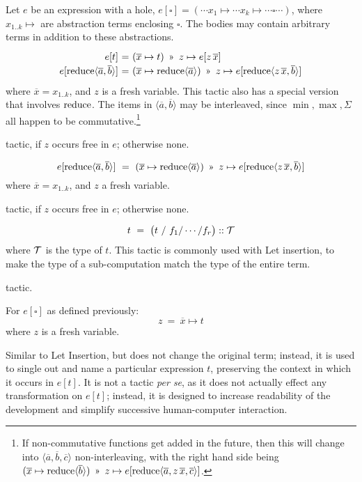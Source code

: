 \vspace{3mm}
Let $e$ be an expression with a hole, $e[\square] = (\cdots x_1 \mapsto \cdots x_k\mapsto \cdots \square \cdots)$, 
where $x_{1..k}\mapsto$ are abstraction terms enclosing $\square$. The bodies may contain arbitrary terms
in addition to these abstractions.
%
\[\renewcommand\arraystretch{1.2}
  \begin{array}{@{}r@{}c@{}l@{}}
  e[t] & ~=~ & (\overline{x}\mapsto t) ~\applt~ z\mapsto e[z\,\overline{x}] \\
  e[\reduce \langle\overline{a},\overline{b}\rangle] & ~=~ &
     (\overline{x}\mapsto \reduce\langle\overline{a}\rangle) ~\applt~ z\mapsto e[\reduce\langle z\,\overline{x}, \overline{b}\rangle]
  \end{array}\]
%
where $\overline{x}=x_{1..k}$, and $z$ is a fresh variable.
This tactic also has a special version that involves $\operatorname{reduce}$.
The items in $\langle \overline{a},\overline{b}\rangle$ may be interleaved, since
$\min,\max,\Sigma$ all happen to be commutative.\footnote{If non-commutative functions get added in the future, then this will change into $\langle \overline{a}, \overline{b}, \overline{c}\rangle$ non-interleaving, with the right hand side being $(\overline{x}\mapsto \reduce\langle\overline{b}\rangle) ~\applt~ z\mapsto e[\reduce\langle \overline{a}, z\,\overline{x}, \overline{c}\rangle]$.}

\Obligations tactic, if $z$ occurs free in $e$; otherwise none.

%
\[e[\reduce \langle\overline{a},\overline{b}\rangle] ~=~ 
  (\overline{x}\mapsto \reduce\langle\overline{a}\rangle) ~\applt~ z\mapsto e[\reduce\langle z\,\overline{x}, \overline{b}\rangle]\]
%
where $\overline{x}=x_{1..k}$, and $z$ a fresh variable.

\Obligations tactic, if $z$ occurs free in $e$; otherwise none.

\[t ~=~ \big(t~/~f_1/\cdots/f_r\big) :: \mathcal{T}\]
%
where $\mathcal{T}$ is the type of $t$. This tactic is commonly used with Let insertion,
to make the type of a sub-computation match the type of the entire term.

\Obligations tactic.

\vspace{3mm}
For $e[\square]$ as defined previously:
\[z ~=~ \overline{x}\mapsto t\]
%
where $z$ is a fresh variable.

Similar to Let Insertion, but does not change the original term; instead,
it is used to single out and name a particular expression $t$, preserving the context
in which it occurs in $e[t]$. It is not a tactic {\it per se}, as it does not
actually effect any transformation on $e[t]$; instead, it is designed to increase
readability of the development and simplify successive human-computer interaction.
